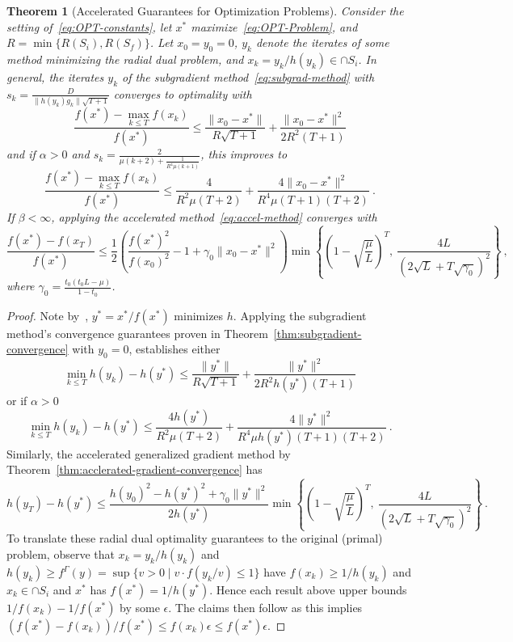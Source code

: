 \documentclass[sn-mathphys,Numbered]{sn-jnl}%
\newtheorem{theorem}{Theorem}%
\begin{document}
\begin{theorem}[Accelerated Guarantees for Optimization Problems] \label{thm:OPT-rates}
    Consider the setting of~\eqref{eq:OPT-constants}, let $x^*$ maximize~\eqref{eq:OPT-Problem}, and $R=\min\{R(S_i), R(S_f)\}$. Let $x_0=y_0=0$, $y_k$ denote the iterates of some method minimizing the radial dual problem, and $x_k = y_k/h(y_k) \in \cap S_i$.
    In general, the iterates $y_k$ of the subgradient method~\eqref{eq:subgrad-method} with $s_k = \frac{D}{\|h(y_k)g_k\|\sqrt{T+1}}$ converges to optimality with
    $$ \frac{f(x^*) - \max_{k\leq T} f(x_k)}{f(x^*)} \leq  \frac{\|x_0-x^*\|}{R\sqrt{T+1}} + \frac{\|x_0-x^*\|^2}{2R^2(T+1)} $$
    and if $\alpha>0$ and $s_k=\frac{2}{\mu(k+2)+\frac{1}{R^4\mu(k+1)}}$, this improves to
    $$ \frac{f(x^*) - \max_{k\leq T} f(x_k)}{f(x^*)} \leq \frac{4}{R^2\mu(T+2)} + \frac{4\|x_0-x^*\|^2}{R^4\mu(T+1)(T+2)} \ . $$
    If $\beta<\infty$, applying the accelerated method~\eqref{eq:accel-method} converges with
    $$ \frac{f(x^*) -f(x_T)}{f(x^*)} \leq \frac{1}{2}\left(\frac{f(x^*)^2}{f(x_0)^2} - 1  + \gamma_0\|x_0-x^*\|^2\right)\min\left\{\left(1-\sqrt{\frac{\mu}{L}}\right)^T,\ \frac{4L}{\left(2\sqrt{L} +T\sqrt{\gamma_0}\right)^2}\right\} \ , $$
    where $\gamma_0=\frac{t_0(t_0L-\mu)}{1-t_0}$.
\end{theorem}
\begin{proof}
    Note by~\cite[Proposition 24]{grimmer2023radial1}, $y^*=x^*/f(x^*)$ minimizes $h$.
    Applying the subgradient method's convergence guarantees proven in Theorem~\ref{thm:subgradient-convergence} with $y_0=0$, establishes either
     $$ \min_{k\leq T} h(y_k) - h(y^*) \leq \frac{\|y^*\|}{R\sqrt{T+1}} + \frac{\|y^*\|^2}{2R^2h(y^*)(T+1)} $$
     or if $\alpha>0$
     $$ \min_{k\leq T} h(y_k) - h(y^*) \leq \frac{4h(y^*)}{R^2\mu(T+2)} + \frac{4\|y^*\|^2}{R^4\mu h(y^*)(T+1)(T+2)} \ . $$
    Similarly, the accelerated generalized gradient method by Theorem~\ref{thm:acclerated-gradient-convergence} has
     $$ h(y_T) - h(y^*) \leq \frac{h(y_0)^2 - h(y^*)^2 + \gamma_0\|y^*\|^2}{2 h(y^*)} \min\left\{\left(1-\sqrt{\frac{\mu}{L}}\right)^T,\ \frac{4L}{\left(2\sqrt{L} +T\sqrt{\gamma_0}\right)^2}\right\} \ . $$
    To translate these radial dual optimality guarantees to the original (primal) problem, observe that $x_k=y_k/h(y_k)$ and $h(y_k)\geq f^{\Gamma}(y)=\sup \{v>0 \mid v\cdot f(y_k/v)\leq 1\}$ have $f(x_k) \geq 1/h(y_k)$ and $x_k \in \cap S_i$ and $x^*$ has $f(x^*) = 1/h(y^*)$. Hence each result above upper bounds $1/f(x_k) - 1/f(x^*)$ by some $\epsilon$. The claims then follow as this implies $(f(x^*) - f(x_k))/f(x^*) \leq f(x_k) \epsilon \leq f(x^*)\epsilon$.
\end{proof}
\end{document}

